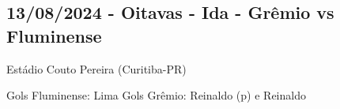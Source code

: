 \newpage
\subsection{13/08/2024 - Oitavas - Ida - Grêmio vs Fluminense}

\begin{figure}[H]
    \centering
    
\end{figure}

Estádio Couto Pereira (Curitiba-PR)

Gols Fluminense: Lima
Gols Grêmio: Reinaldo (p) e Reinaldo
